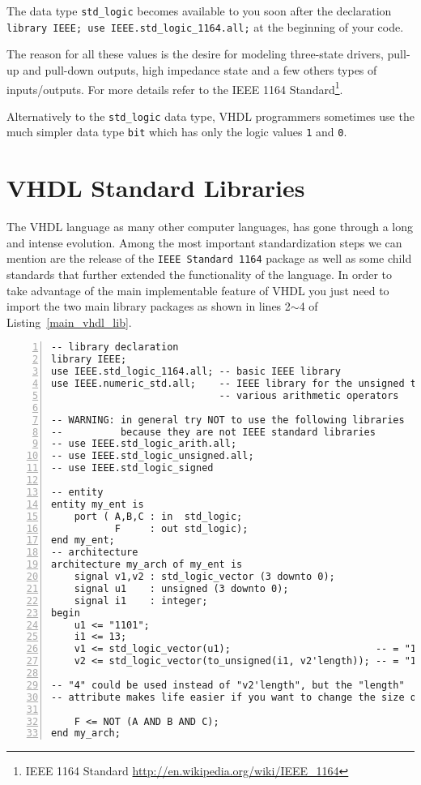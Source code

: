 The data type \texttt{std\_logic} becomes available to you soon after the declaration \texttt{library IEEE; use IEEE.std\_logic\_1164.all;} at the beginning of your code.

The reason for all these values is the desire for modeling three-state drivers, pull-up and pull-down outputs, high impedance state and a few others types of inputs/outputs. For more details refer to the IEEE 1164 Standard\footnote{IEEE 1164 Standard \footnotesize\url{http://en.wikipedia.org/wiki/IEEE_1164}}.

Alternatively to the \texttt{std\_logic} data type, VHDL programmers sometimes use the much simpler data type \texttt{bit} which has only the logic values \texttt{1} and \texttt{0}.

\section{VHDL Standard Libraries}
The VHDL language as many other computer languages, has gone through a long and intense evolution. Among the most important standardization steps we can mention are the release of the \texttt{IEEE Standard 1164} package as well as some child standards that further extended the functionality of the language. In order to take advantage of the main implementable feature of VHDL you just need to import the two main library packages as shown in lines 2$\sim$4 of Listing~\ref{main_vhdl_lib}.

\noindent
\begin{minipage}{0.99\linewidth}
\begin{lstlisting}[numbers=left,label=main_vhdl_lib, caption=Typical inclusions of IEEE standard libraries.]
-- library declaration
library IEEE;
use IEEE.std_logic_1164.all; -- basic IEEE library
use IEEE.numeric_std.all;    -- IEEE library for the unsigned type and
                             -- various arithmetic operators

-- WARNING: in general try NOT to use the following libraries
--          because they are not IEEE standard libraries
-- use IEEE.std_logic_arith.all;
-- use IEEE.std_logic_unsigned.all;
-- use IEEE.std_logic_signed

-- entity
entity my_ent is
	port ( A,B,C : in  std_logic;
	       F     : out std_logic);
end my_ent;
-- architecture
architecture my_arch of my_ent is
    signal v1,v2 : std_logic_vector (3 downto 0);
    signal u1    : unsigned (3 downto 0);
    signal i1    : integer;
begin
    u1 <= "1101";
    i1 <= 13;
    v1 <= std_logic_vector(u1);                         -- = "1101"
    v2 <= std_logic_vector(to_unsigned(i1, v2'length)); -- = "1101"

-- "4" could be used instead of "v2'length", but the "length"
-- attribute makes life easier if you want to change the size of v2

	F <= NOT (A AND B AND C);
end my_arch;
\end{lstlisting}
\end{minipage}

